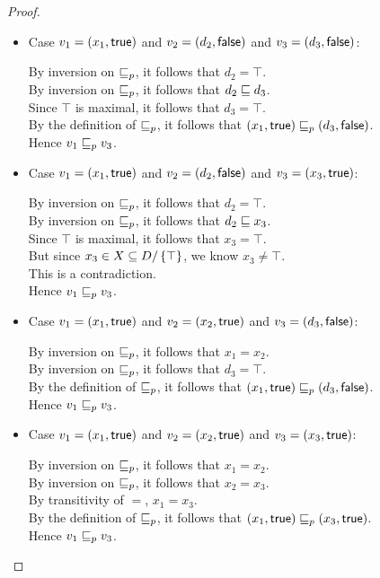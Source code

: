\begin{proof}
\begin{enumerate}
\begin{enumerate}
\begin{itemize}
  \item Case $v_1 = (x_1, \textsf{true})$ and $v_2 = (d_2, \textsf{false})$ and $v_3 = (d_3, \textsf{false})$:

    By inversion on $\sqsubseteq_p$, it follows that $d_2 = \top$. \\ 
    By inversion on $\sqsubseteq_p$, it follows that $d_2 \sqsubseteq d_3$. \\ 
    Since $\top$ is maximal, it follows that $d_3 = \top$. \\ 
    By the definition of $\sqsubseteq_p$, it follows that $(x_1, \textsf{true}) \sqsubseteq_p (d_3, \textsf{false})$. \\ 
    Hence $v_1 \sqsubseteq_p v_3$. 

  \item Case $v_1 = (x_1, \textsf{true})$ and $v_2 = (d_2, \textsf{false})$ and $v_3 = (x_3, \textsf{true})$:

    By inversion on $\sqsubseteq_p$, it follows that $d_2 = \top$. \\ 
    By inversion on $\sqsubseteq_p$, it follows that $d_2 \sqsubseteq x_3$. \\ 
    Since $\top$ is maximal, it follows that $x_3 = \top$. \\
    But since $x_3 \in X \subseteq D/\left\{\top\right\}$, we know $x_3 \not= \top$. \\ 
    This is a contradiction. \\
    Hence $v_1 \sqsubseteq_p v_3$. 


  \item Case $v_1 = (x_1, \textsf{true})$ and $v_2 = (x_2, \textsf{true})$ and $v_3 = (d_3, \textsf{false})$:

    By inversion on $\sqsubseteq_p$, it follows that $x_1 = x_2$. \\ 
    By inversion on $\sqsubseteq_p$, it follows that $d_3 = \top$. \\ 
    By the definition of $\sqsubseteq_p$, it follows that $(x_1, \textsf{true}) \sqsubseteq_p (d_3, \textsf{false})$. \\ 
    Hence $v_1 \sqsubseteq_p v_3$. 

  \item Case $v_1 = (x_1, \textsf{true})$ and $v_2 = (x_2, \textsf{true})$ and $v_3 = (x_3, \textsf{true})$:

    By inversion on $\sqsubseteq_p$, it follows that $x_1 = x_2$. \\ 
    By inversion on $\sqsubseteq_p$, it follows that $x_2 = x_3$. \\ 
    By transitivity of $=$, $x_1 = x_3$. \\ 
    By the definition of $\sqsubseteq_p$, it follows that $(x_1, \textsf{true}) \sqsubseteq_p (x_3, \textsf{true})$. \\ 
    Hence $v_1 \sqsubseteq_p v_3$. 
    

\end{itemize}
\end{enumerate}
\end{enumerate}
\end{proof}
